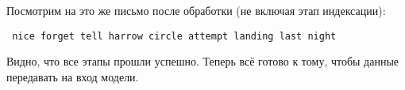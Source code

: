 Посмотрим на это же письмо после обработки (не включая этап индексации):
\begin{verbatim}
 nice forget tell harrow circle attempt landing last night
\end{verbatim}

Видно, что все этапы прошли успешно. Теперь всё готово к тому, чтобы данные передавать на вход модели.

